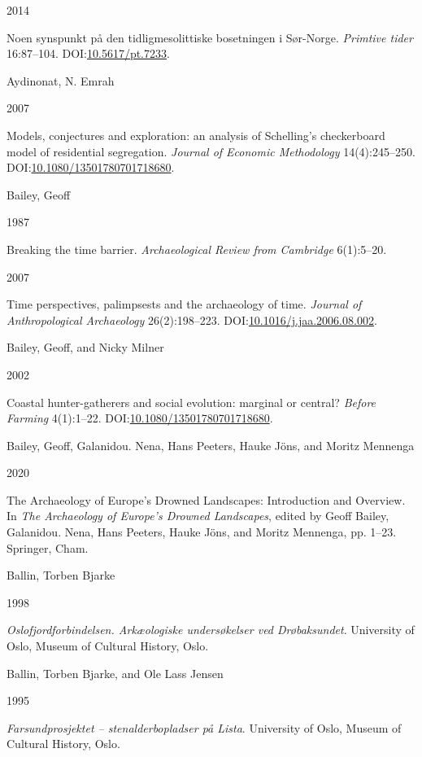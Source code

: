 \documentclass[
  12pt,
  a4paper,
  oneside]{book}
\newlength{\cslhangindent}
\newlength{\csllabelwidth}
\newlength{\cslentryspacingunit} %
\newenvironment{CSLReferences}[2] %
 {%
  \setlength{\parindent}{0pt}
  \ifodd #1
  \let\oldpar\par
  \def\par{\hangindent=\cslhangindent\oldpar}
  \fi
  \setlength{\parskip}{#2\cslentryspacingunit}
 }%
 {}
\newcommand{\CSLBlock}[1]{#1\hfill\break}
\newcommand{\CSLLeftMargin}[1]{\parbox[t]{\csllabelwidth}{#1}}
\newcommand{\CSLRightInline}[1]{\parbox[t]{\linewidth - \csllabelwidth}{#1}\break}
\begin{document}
\begin{CSLReferences}{0}{0}
\leavevmode{}%
\CSLLeftMargin{ 2014 }%
\CSLRightInline{{Noen synspunkt på den tidligmesolittiske bosetningen i Sør-Norge}. \emph{Primtive tider} 16:87--104. DOI:\href{https://doi.org/10.5617/pt.7233}{10.5617/pt.7233}.}

\leavevmode{}%
\CSLBlock{Aydinonat, N. Emrah}
\CSLLeftMargin{ 2007}%
\CSLRightInline{{Models, conjectures and exploration: an analysis of Schelling's checkerboard model of residential segregation}. \emph{Journal of Economic Methodology} 14(4):245--250. DOI:\href{https://doi.org/10.1080/13501780701718680}{10.1080/13501780701718680}.}

\leavevmode{}%
\CSLBlock{Bailey, Geoff}
\CSLLeftMargin{ 1987}%
\CSLRightInline{Breaking the time barrier. \emph{Archaeological Review from Cambridge} 6(1):5--20.}

\leavevmode{}%
\CSLLeftMargin{ 2007 }%
\CSLRightInline{Time perspectives, palimpsests and the archaeology of time. \emph{Journal of Anthropological Archaeology} 26(2):198--223. DOI:\href{https://doi.org/10.1016/j.jaa.2006.08.002}{10.1016/j.jaa.2006.08.002}.}

\leavevmode{}%
\CSLBlock{Bailey, Geoff, and Nicky Milner}
\CSLLeftMargin{ 2002}%
\CSLRightInline{{Coastal hunter-gatherers and social evolution: marginal or central?} \emph{Before Farming} 4(1):1--22. DOI:\href{https://doi.org/10.1080/13501780701718680}{10.1080/13501780701718680}.}

\leavevmode{}%
\CSLBlock{Bailey, Geoff, Galanidou. Nena, Hans Peeters, Hauke Jöns, and Moritz Mennenga}
\CSLLeftMargin{ 2020}%
\CSLRightInline{{The Archaeology of Europe's Drowned Landscapes: Introduction and Overview}. In \emph{{The Archaeology of Europe's Drowned Landscapes}}, edited by Geoff Bailey, Galanidou. Nena, Hans Peeters, Hauke Jöns, and Moritz Mennenga, pp. 1--23. Springer, Cham.}

\leavevmode{}%
\CSLBlock{Ballin, Torben Bjarke}
\CSLLeftMargin{ 1998}%
\CSLRightInline{\emph{{Oslofjordforbindelsen. Arkæologiske undersøkelser ved Drøbaksundet}}. University of Oslo, Museum of Cultural History, Oslo.}

\leavevmode{}%
\CSLBlock{Ballin, Torben Bjarke, and Ole Lass Jensen}
\CSLLeftMargin{ 1995}%
\CSLRightInline{\emph{{Farsundprosjektet -- stenalderbopladser på Lista}}. University of Oslo, Museum of Cultural History, Oslo.}


\end{CSLReferences}
\end{document}
